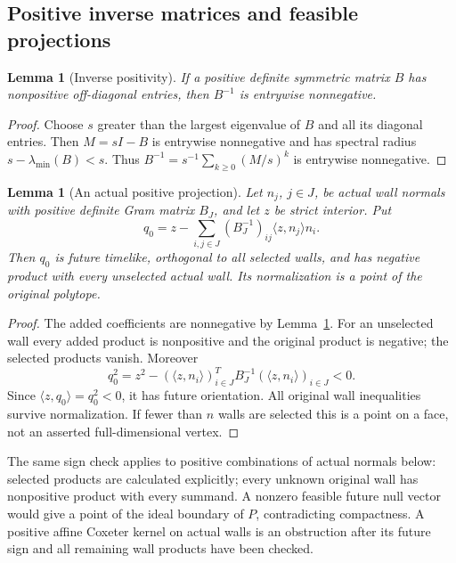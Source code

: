 \documentclass[11pt]{article}
\newtheorem{lemma}[theorem]{Lemma}
\theoremstyle{definition}
\theoremstyle{remark}
\newcommand{\ip}[2]{\langle #1,#2\rangle}
\begin{document}
\subsection{Positive inverse matrices and feasible projections}
\begin{lemma}[Inverse positivity]
\label{lem:inverse}
If a positive definite symmetric matrix \(B\) has nonpositive
off-diagonal entries, then \(B^{-1}\) is entrywise nonnegative.
\end{lemma}
\begin{proof}
Choose \(s\) greater than the largest eigenvalue of \(B\) and all its
diagonal entries. Then \(M=sI-B\) is entrywise nonnegative and has
spectral radius \(s-\lambda_{\min}(B)<s\). Thus
\(B^{-1}=s^{-1}\sum_{k\geq0}(M/s)^k\) is entrywise nonnegative.
\end{proof}
\begin{lemma}[An actual positive projection]
\label{lem:projection}
Let \(n_j\), \(j\in J\), be actual wall normals with positive
definite Gram matrix \(B_J\), and let \(z\) be strict interior.
Put
\[
 q_0=z-\sum_{i,j\in J}(B_J^{-1})_{ij}\ip{z}{n_j}n_i.
\]
Then \(q_0\) is future timelike, orthogonal to all selected walls,
and has negative product with every unselected actual wall.
Its normalization is a point of the original polytope.
\end{lemma}
\begin{proof}
The added coefficients are nonnegative by Lemma~\ref{lem:inverse}.
For an unselected wall every added product is nonpositive and the
original product is negative; the selected products vanish.
Moreover
\[
 q_0^2=z^2-
   (\ip{z}{n_i})_{i\in J}^{T}B_J^{-1}
   (\ip{z}{n_i})_{i\in J}<0.
\]
Since \(\ip{z}{q_0}=q_0^2<0\), it has future orientation.
All original wall inequalities survive normalization.
If fewer than \(n\) walls are selected this is a point on a face,
not an asserted full-dimensional vertex.
\end{proof}
The same sign check applies to positive combinations of actual
normals below: selected products are calculated explicitly; every
unknown original wall has nonpositive product with every summand.
A nonzero feasible future null vector would give a point of the
ideal boundary of \(P\), contradicting compactness. A positive
affine Coxeter kernel on actual walls is an obstruction after its
future sign and all remaining wall products have been checked.
\end{document}
